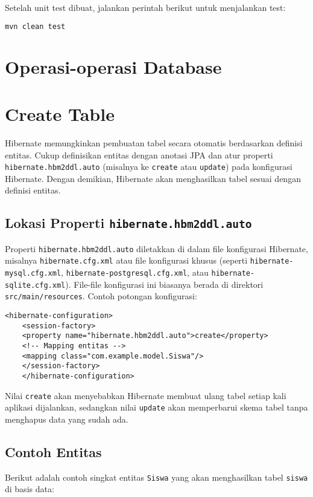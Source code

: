Setelah unit test dibuat, jalankan perintah berikut untuk menjalankan test:

\begin{lstlisting}[language=bash, style=XmlStyle]
	mvn clean test
\end{lstlisting}


\section{Operasi-operasi Database}

\section{Create Table}

Hibernate memungkinkan pembuatan tabel secara otomatis berdasarkan definisi entitas. Cukup definisikan entitas dengan anotasi JPA dan atur properti \texttt{hibernate.hbm2ddl.auto} (misalnya ke \texttt{create} atau \texttt{update}) pada konfigurasi Hibernate. Dengan demikian, Hibernate akan menghasilkan tabel sesuai dengan definisi entitas.

\subsection*{Lokasi Properti \texttt{hibernate.hbm2ddl.auto}}
Properti \texttt{hibernate.hbm2ddl.auto} diletakkan di dalam file konfigurasi Hibernate, misalnya \texttt{hibernate.cfg.xml} atau file konfigurasi khusus (seperti \texttt{hibernate-mysql.cfg.xml}, \texttt{hibernate-postgresql.cfg.xml}, atau \texttt{hibernate-sqlite.cfg.xml}). File-file konfigurasi ini biasanya berada di direktori \texttt{src/main/resources}. Contoh potongan konfigurasi:
\begin{lstlisting}[style=XmlStyle]
	<hibernate-configuration>
	<session-factory>
	<property name="hibernate.hbm2ddl.auto">create</property>
	<!-- Mapping entitas -->
	<mapping class="com.example.model.Siswa"/>
	</session-factory>
	</hibernate-configuration>
\end{lstlisting}
Nilai \texttt{create} akan menyebabkan Hibernate membuat ulang tabel setiap kali aplikasi dijalankan, sedangkan nilai \texttt{update} akan memperbarui skema tabel tanpa menghapus data yang sudah ada.

\subsection*{Contoh Entitas}
Berikut adalah contoh singkat entitas \texttt{Siswa} yang akan menghasilkan tabel \texttt{siswa} di basis data:

